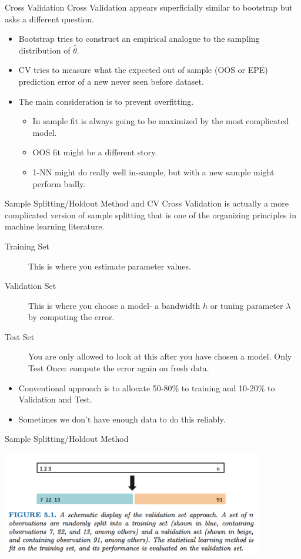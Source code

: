 \documentclass[aspectratio=169]{beamer}
\begin{document}
\begin{frame}{Cross Validation}
Cross Validation appears superficially similar to bootstrap but asks a different question.
\begin{itemize}
\item Bootstrap tries to construct an empirical analogue to the sampling distribution of $\hat{\theta}$.
\item CV tries to measure what the expected out of sample (OOS or EPE) prediction error of a new never seen before dataset.
\item The main consideration is to prevent \alert{overfitting}.
\begin{itemize}
\item In sample fit is always going to be maximized by the most complicated model.
\item OOS fit might be a different story.
\item 1-NN might do really well in-sample, but with a new sample might perform badly.
\end{itemize}
\end{itemize}
\end{frame}

\begin{frame}{Sample Splitting/Holdout Method and CV}
Cross Validation is actually a more complicated version of \alert{sample splitting} that is one of the organizing principles in machine learning literature.

\begin{description}
\item[Training Set] This is where you estimate parameter values.
\item[Validation Set] This is where you choose a model- a bandwidth $h$ or tuning parameter $\lambda$ by computing the error.
\item[Test Set] You are only allowed to look at this after you have chosen a model. \alert{Only Test Once}: compute the error again on fresh data.
\end{description}
\begin{itemize}
\item Conventional approach is to allocate 50-80\% to training and 10-20\% to Validation and Test.
\item Sometimes we don't have enough data to do this reliably.
\end{itemize}
\end{frame}

\begin{frame}{Sample Splitting/Holdout Method}
\begin{center}
\includegraphics[width=4.5in]{./resources/split-sample}
\end{center}
\end{frame}
\end{document}
